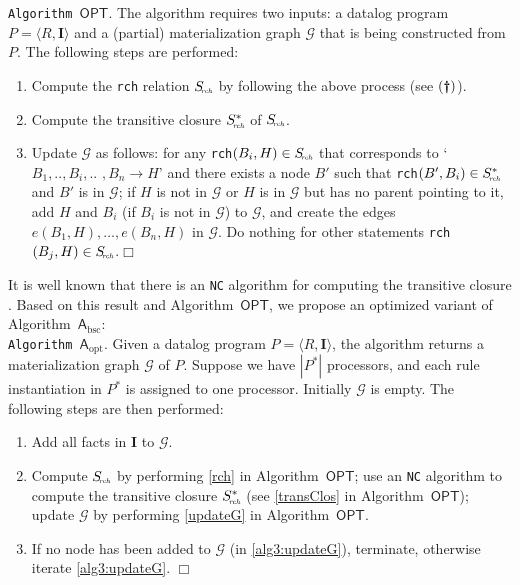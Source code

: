 \noindent\texttt{Algorithm~$\mathsf{OPT}$}. The algorithm requires two inputs:
a datalog program $P=\langle R, \textbf{I}\rangle$ and a (partial) materialization graph $\mathcal{G}$ that is
being constructed from $P$. The following steps are performed:
\begin{enumerate}[leftmargin=6ex,label=(\textbf{\roman*})]
\item Compute the \texttt{rch} relation $S_{\!\textit{\tiny rch}}$ by following the above process (see $(\textbf{\dag})$).\label{rch}
\item Compute the transitive closure $S^*_{\!\textit{\tiny rch}}$ of $S_{\!\textit{\tiny rch}}$.\label{transClos}
\item Update $\mathcal{G}$ as follows: for any \texttt{rch}$(B_i,H)\in S_{\!\textit{\tiny rch}}$
that corresponds to `$B_1,..,B_i,..$ $,B_n\rightarrow H$'
    and there exists a node $B'$ such that \texttt{rch}$(B',B_i)\in S^*_{\!\textit{\tiny rch}}$ and $B'$ is
    in $\mathcal{G}$; if $H$ is not in $\mathcal{G}$ or $H$ is in $\mathcal{G}$ but has no parent pointing
    to it, add $H$ and $B_i$ (if $B_i$ is not in $\mathcal{G}$) to $\mathcal{G}$, and create the edges
    $e(B_1, H), \ldots, e(B_n, H)$ in $\mathcal{G}$. Do nothing for other statements
    \texttt{rch}$(B_j,H)\in S_{\!\textit{\tiny rch}}$.\label{updateG}\hfill$\Box$
\end{enumerate}

It is well known that there is an \texttt{NC} algorithm for computing the
transitive closure \cite{Allender07}.
Based on this result and Algorithm~$\mathsf{OPT}$, we propose an optimized variant of Algorithm~$\mathsf{A}_{\text{bsc}}$:\\

\noindent\texttt{Algorithm~$\mathsf{A}_{\text{opt}}$}. Given a datalog program $P=\langle R, \textbf{I}\rangle$, the algorithm
returns a materialization graph $\mathcal{G}$ of $P$.
Suppose we have $|P^*|$ processors, and each rule instantiation in $P^*$ is
assigned to one processor.
Initially $\mathcal{G}$ is empty. The following steps are then performed:
\begin{enumerate}[leftmargin=8ex,label=(\textit{Step \arabic*}),ref=Step~\arabic*]
\item Add all facts in $\textbf{I}$ to $\mathcal{G}$.\label{alg3:addFacts}
\item Compute $S_{\!\textit{\tiny rch}}$ by performing \ref{rch} in Algorithm~$\mathsf{OPT}$; use an \texttt{NC}
    algorithm to compute the transitive closure $S^*_{\!\textit{\tiny rch}}$ (see \ref{transClos} in Algorithm~$\mathsf{OPT}$);
    update $\mathcal{G}$ by performing \ref{updateG}  in Algorithm~$\mathsf{OPT}$.\label{alg3:updateG}
\item If no node has been added to $\mathcal{G}$ (in \ref{alg3:updateG}), terminate,
    otherwise iterate \ref{alg3:updateG}. \label{alg3:halt}\hfill$\Box$
\end{enumerate}

